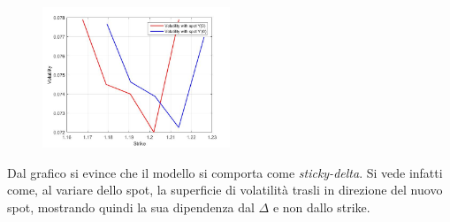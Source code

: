 \documentclass[11pt]{article}
\begin{document}
\begin{figure}[H]
\centering
\includegraphics[width=0.5\textwidth]{sticky_delta}
\end{figure}
Dal grafico si evince che il modello si comporta come \textit{sticky-delta}. Si vede infatti come, al variare dello spot, la superficie di volatilità trasli in direzione del nuovo spot, mostrando quindi la sua dipendenza dal $\Delta$ e non dallo strike.
\end{document}

